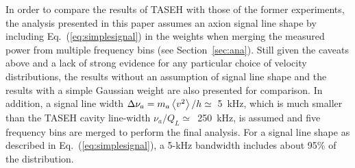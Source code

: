 In order to compare the results of TASEH with those of the former experiments, 
the analysis presented in this paper assumes an axion 
signal line shape by including Eq.~(\ref{eq:simplesignal}) in the weights 
when merging the measured power from multiple frequency bins 
(see Section~\ref{sec:ana}). Still given the caveats above and a lack of 
strong evidence for any particular choice of velocity distributions, 
the results without an assumption of signal line shape and the results 
with a simple Gaussian weight are also presented for comparison. 
In addition, a signal line width 
$\Delta\nu_a=m_a\left<v^2\right>/h\simeq$~5~kHz, which is much smaller than 
the TASEH cavity line-width $\nu_a/Q_L\simeq$~250~kHz, is assumed and 
five frequency bins are merged to perform the final analysis. For a signal 
line shape as described in Eq.~(\ref{eq:simplesignal}), a 5-kHz bandwidth 
includes about 95\% of the distribution.


 

